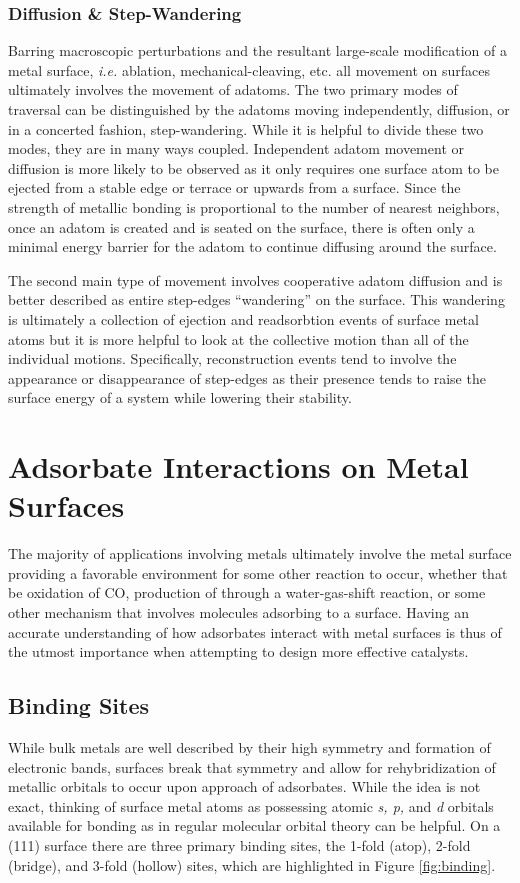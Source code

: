 \subsubsection{Diffusion \& Step-Wandering}
Barring macroscopic perturbations and the resultant large-scale modification of
a metal surface, {\em i.e.} ablation, mechanical-cleaving, etc. all movement on
surfaces ultimately involves the movement of adatoms. The two primary modes of
traversal can be distinguished by the adatoms moving independently, diffusion,
or in a concerted fashion, step-wandering. While it is helpful to divide these
two modes, they are in many ways coupled.  Independent adatom movement or
diffusion is more likely to be observed as it only requires one surface atom to
be ejected from a stable edge or terrace or upwards from a surface.  Since the
strength of metallic bonding is proportional to the number of nearest
neighbors, once an adatom is created and is seated on the surface, there is
often only a minimal energy barrier for the adatom to continue diffusing around
the surface.

The second main type of movement involves cooperative adatom diffusion and is
better described as entire step-edges ``wandering'' on the surface. This
wandering is ultimately a collection of ejection and readsorbtion events of
surface metal atoms but it is more helpful to look at the collective motion
than all of the individual motions. Specifically, reconstruction events tend to
involve the appearance or disappearance of step-edges as their presence tends
to raise the surface energy of a system while lowering their stability.

\section{Adsorbate Interactions on Metal Surfaces}
The majority of applications involving metals ultimately involve the metal
surface providing a favorable environment for some other reaction to occur,
whether that be oxidation of CO, production of  through a
water-gas-shift reaction, or some other mechanism that involves molecules
adsorbing to a surface. Having an accurate understanding of how adsorbates
interact with metal surfaces is thus of the utmost importance when attempting
to design more effective catalysts.

\subsection{Binding Sites}
While bulk metals are well described by their  high symmetry and formation of
electronic bands, surfaces break that symmetry and allow for rehybridization of
metallic orbitals to occur upon approach of adsorbates. While the idea is not
exact, thinking of surface metal atoms as possessing atomic {\em s, p, } and {\em d}
orbitals available for bonding as in regular molecular orbital theory can be
helpful. On a (111) surface there are three primary binding sites, the 1-fold
(atop), 2-fold (bridge), and 3-fold (hollow) sites, which are highlighted in
Figure \ref{fig:binding}. 

